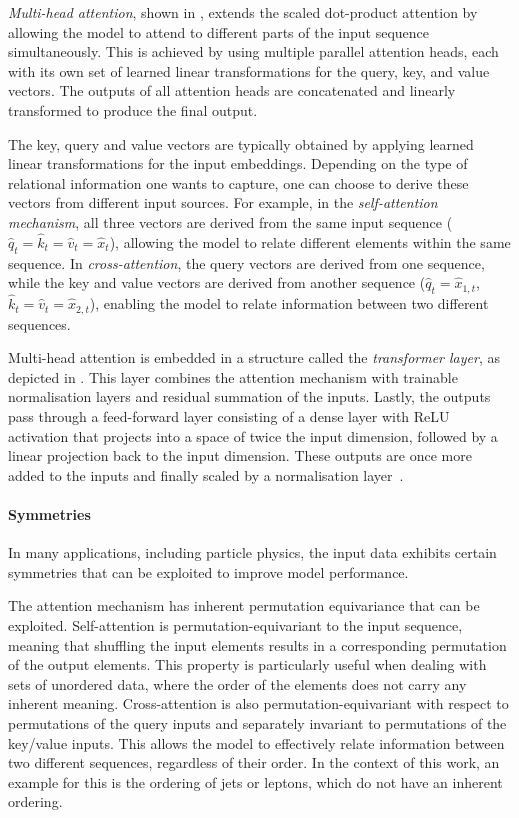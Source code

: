 \textit{Multi-head attention}, shown in , extends the scaled dot-product attention by allowing the model to attend to different parts of the input sequence simultaneously. This is achieved by using multiple parallel attention heads, each with its own set of learned linear transformations for the query, key, and value vectors. The outputs of all attention heads are concatenated and linearly transformed to produce the final output.

The key, query and value vectors are typically obtained by applying learned linear transformations for the input embeddings. Depending on the type of relational information one wants to capture, one can choose to derive these vectors from different input sources. For example, in the \textit{self-attention mechanism}, all three vectors are derived from the same input sequence ($\hat q_t = \hat k_t=\hat v_t = \hat x_t$), allowing the model to relate different elements within the same sequence. In \textit{cross-attention}, the query vectors are derived from one sequence, while the key and value vectors are derived from another sequence ($\hat q_t = \hat x_{1,t}$, $\hat k_t=\hat v_t = \hat x_{2,t}$), enabling the model to relate information between two different sequences.

Multi-head attention is embedded in a structure called the \textit{transformer layer}, as depicted in . This layer combines the attention mechanism with trainable normalisation layers and residual summation of the inputs. Lastly, the outputs pass through a feed-forward layer consisting of a dense layer with ReLU activation that projects into a space of twice the input dimension, followed by a linear projection back to the input dimension. These outputs are once more added to the inputs and finally scaled by a normalisation layer~\cite{attention_is_all_you_need}.
\paragraph{Symmetries}
In many applications, including particle physics, the input data exhibits certain symmetries that can be exploited to improve model performance.

The attention mechanism has inherent permutation equivariance that can be exploited. Self-attention is permutation-equivariant to the input sequence, meaning that shuffling the input elements results in a corresponding permutation of the output elements. This property is particularly useful when dealing with sets of unordered data, where the order of the elements does not carry any inherent meaning.
Cross-attention is also permutation-equivariant with respect to permutations of the query inputs and separately invariant to permutations of the key/value inputs.
This allows the model to effectively relate information between two different sequences, regardless of their order. In the context of this work, an example for this is the ordering of jets or leptons, which do not have an inherent ordering.

